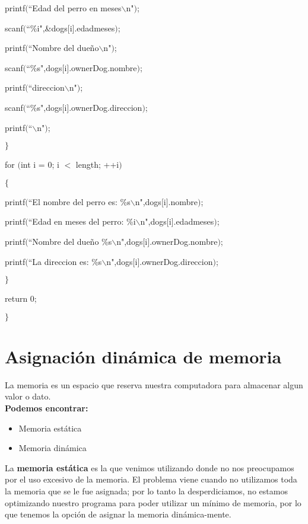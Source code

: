 \documentclass[]{article}
\begin{document}
	printf$($``Edad del perro en meses$\backslash$n"$)$;
	
	scanf$($``\%i",\&dogs$[$i$]$.edadmeses$)$;
	
	printf$($``Nombre del dueño$\backslash$n"$)$;
	
	scanf$($``\%s",dogs$[$i$]$.ownerDog.nombre$)$;
	
	printf$($``direccion$\backslash$n"$)$;
	
	scanf$($``\%s",dogs$[$i$]$.ownerDog.direccion$)$;
	
	printf$($``$\backslash$n"$)$;
	
	$\rbrace$
	
	for $($int i = 0; i $<$ length; ++i$)$
	
	$\lbrace$
	
	printf$($``El nombre del perro es: \%s$\backslash$n",dogs$[$i$]$.nombre$)$;
	
	printf$($``Edad en meses del perro: \%i$\backslash$n",dogs$[$i$]$.edadmeses$)$;
	
	printf$($``Nombre del dueño \%s$\backslash$n",dogs$[$i$]$.ownerDog.nombre$)$;
	
	printf$($``La direccion es: \%s$\backslash$n",dogs$[$i$]$.ownerDog.direccion$)$;
	
	$\rbrace$
	
	return 0;
	
	$\rbrace$
	
	\section{Asignación dinámica de memoria}
	
	La memoria es un espacio que reserva nuestra computadora para almacenar algun valor o dato.\\
	
	\textbf{Podemos encontrar:}
	
	\begin{itemize}
		\item Memoria estática
		\item Memoria dinámica
	\end{itemize}
	
	La \textbf{memoria estática} es la que venimos utilizando donde no nos preocupamos por el uso excesivo de la memoria. El problema viene cuando no utilizamos toda la memoria que se le fue asignada; por lo tanto la desperdiciamos, no estamos optimizando nuestro programa para poder utilizar un mínimo de memoria, por lo que tenemos la opción de asignar la memoria dinámica-mente.\\
	
\end{document}
